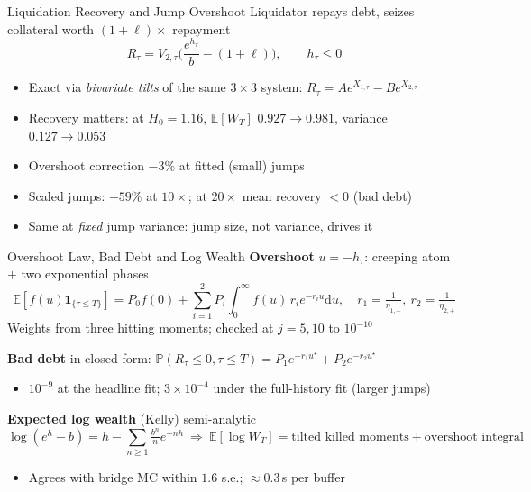 \documentclass[aspectratio=169,10pt]{beamer}
\newcommand{\E}{\mathbb{E}}
\newcommand{\Pbb}{\mathbb{P}}
\newcommand{\one}{\mathbf{1}}
\newcommand{\diff}{\mathrm{d}}
\begin{document}
\begin{frame}{Liquidation Recovery and Jump Overshoot}
  \small
  Liquidator repays debt, seizes collateral worth $(1+\ell)\times$ repayment
  \[
    R_\tau = V_{2,\tau}\Big(\frac{e^{h_\tau}}{b}-(1+\ell)\Big),\qquad h_\tau\le0
  \]
  \begin{itemize}
    \item Exact via \emph{bivariate tilts} of the same $3\times3$ system: $R_\tau=Ae^{X_{1,\tau}}-Be^{X_{2,\tau}}$
    \item Recovery matters: at $H_0=1.16$, $\E[W_T]$ $0.927\to0.981$, variance $0.127\to0.053$
    \item Overshoot correction $-3\%$ at fitted (small) jumps
    \item Scaled jumps: $-59\%$ at $10\times$; at $20\times$ mean recovery $<0$ (bad debt)
    \item Same at \emph{fixed} jump variance: \alert{jump size}, not variance, drives it
  \end{itemize}
\end{frame}

\begin{frame}{Overshoot Law, Bad Debt and Log Wealth}
  \small
  \textbf{Overshoot} $u=-h_\tau$: creeping atom $+$ two exponential phases
  \[
    \E[f(u)\one_{\{\tau\le T\}}]=P_0f(0)+\sum_{i=1}^2P_i\!\int_0^\infty\! f(u)\,r_ie^{-r_iu}\diff u,
    \quad r_1=\tfrac1{\eta_{1,-}},\ r_2=\tfrac1{\eta_{2,+}}
  \]
  Weights from three hitting moments; checked at $j=5,10$ to $10^{-10}$
  \vspace{0.3em}

  \textbf{Bad debt} in closed form: $\Pbb(R_\tau\le0,\tau\le T)=P_1e^{-r_1u^\star}+P_2e^{-r_2u^\star}$
  \begin{itemize}
    \item $10^{-9}$ at the headline fit; $3\times10^{-4}$ under the full-history fit (larger jumps)
  \end{itemize}
  \vspace{0.3em}

  \textbf{Expected log wealth} (Kelly) semi-analytic
  \[
    \log(e^h-b)=h-\sum_{n\ge1}\tfrac{b^n}{n}e^{-nh}
    \ \Rightarrow\ \E[\log W_T] = \text{tilted killed moments} + \text{overshoot integral}
  \]
  \begin{itemize}
    \item Agrees with bridge MC within $1.6$ s.e.; $\approx0.3$\,s per buffer
  \end{itemize}
\end{frame}
\end{document}
